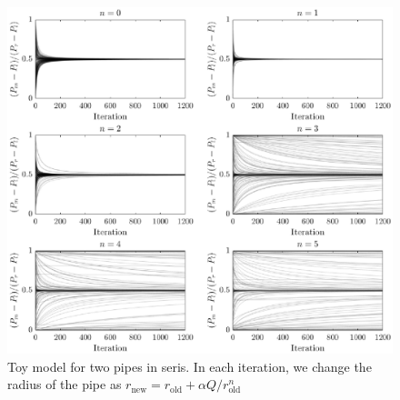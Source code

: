 \begin{figure}[h]
  \centerline{\includegraphics[width=1\textwidth]{./Figs/toy-model-series}}
\caption{Toy model for two pipes in seris. In each iteration, we
  change the radius of the pipe as $r_{\text{new}} = r_{\text{old}} +  \alpha Q/r_{\text{old}}^n$}
\label{toy-series}
\end{figure}  


\newpage
